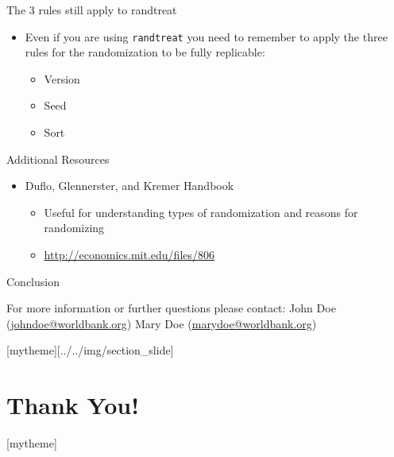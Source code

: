 \documentclass[aspectratio=169]{beamer}
\newcommand{\sectionpic}[2]{
	\setbeamertemplate{section page}[mytheme][#2]
	\section{#1}
	\setbeamertemplate{section page}[mytheme]
}
\begin{document}
\begin{frame}{The 3 rules still apply to randtreat}
	\begin{itemize}
		\item Even if you are using \texttt{randtreat} you need to remember to apply the three rules for the randomization to be fully replicable:
		\begin{itemize}
			\item Version
			\item Seed
			\item Sort
		\end{itemize}
	\end{itemize}
\end{frame}


\begin{frame}{Additional Resources}
	\begin{itemize}
		\item Duflo, Glennerster, and Kremer Handbook
		\begin{itemize}
			\item Useful for understanding types of randomization and reasons for randomizing
			\item \url{http://economics.mit.edu/files/806}
		\end{itemize}
	\end{itemize}
\end{frame}


\begin{frame}{Conclusion}


\vspace{20mm}
For more information or further questions please contact:
\newline John Doe (\url{johndoe@worldbank.org}) \newline Mary Doe (\url{marydoe@worldbank.org})

\end{frame}

\sectionpic{Thank You!}{../../img/section_slide}
\end{document}
